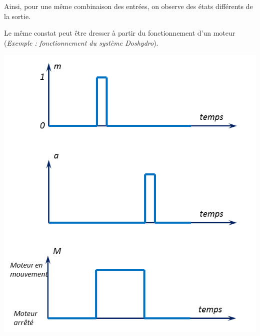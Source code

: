 \documentclass[10pt,fleqn]{article} %
\begin{document}
Ainsi, pour une même combinaison des entrées, on observe des états différents de la sortie.

Le même constat peut être dresser à partir du fonctionnement d'un moteur (\textit{Exemple : fonctionnement du système Doshydro}).


\begin{minipage}[c]{.47\linewidth}
\begin{center}
\includegraphics[width=.9\textwidth]{images/Chrono2}
\end{center}
\end{minipage} \hfill
\end{document}
